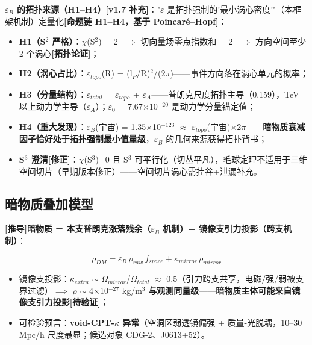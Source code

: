 \documentclass[UTF8,fontset=windows]{csoarticle}
\newcommand{\mtag}[1]{\textbf{[#1]}}
\newcommand{\up}[1]{\ensuremath{^{#1}}}
\newcommand{\down}[1]{\ensuremath{_{#1}}}
\begin{document}
\textbf{\ensuremath{\varepsilon}\down{B} 的拓扑来源（H1--H4）\mtag{v1.7 补充}}："\ensuremath{\varepsilon} 是拓扑强制的'最小涡心密度'"（本框架机制）定量化\mtag{命题链 H1--H4，基于 Poincar\'{e}--Hopf}：
\begin{itemize}
\item \textbf{H1（S\up{2} 严格）}：\ensuremath{\chi}(S\up{2}) = 2 \ensuremath{\implies} 切向量场零点指数和 = 2 \ensuremath{\implies} 方向空间至少 2 个涡心\mtag{拓扑论证}；
\item \textbf{H2（涡心占比）}：\ensuremath{\varepsilon}\down{topo}(R) = (l\down{P}/R)\up{2}/(2\ensuremath{\pi})------事件方向落在涡心单元的概率；
\item \textbf{H3（分量结构）}：\ensuremath{\varepsilon}\down{total} = \ensuremath{\varepsilon}\down{topo} + \ensuremath{\varepsilon}\down{A}------普朗克尺度拓扑主导（0.159），TeV 以上动力学主导（\ensuremath{\varepsilon}\down{A}）；\ensuremath{\varepsilon}\down{0} = 7.67\ensuremath{\times}10\up{-20} 是动力学分量锚定值；
\item \textbf{H4（重大发现）}：\ensuremath{\varepsilon}\down{B}(宇宙) = 1.35\ensuremath{\times}10\up{-123} \ensuremath{\approx} \ensuremath{\varepsilon}\down{topo}(宇宙)\ensuremath{\times}2\ensuremath{\pi}------\textbf{暗物质衰减因子恰好处于拓扑强制最小值量级}，\ensuremath{\varepsilon}\down{B} 的几何来源获得拓扑背书；
\item \textbf{S\up{3} 澄清\mtag{修正}}：\ensuremath{\chi}(S\up{3})=0 且 S\up{3} 可平行化（切丛平凡），毛球定理不适用于三维空间切片（早期版本修正）------空间切片涡心需挂谷+泄漏补充。
\end{itemize}

\subsection{暗物质叠加模型}

\mtag{推导}\textbf{暗物质 = 本支普朗克涨落残余（\ensuremath{\varepsilon}\down{B} 机制）+ 镜像支引力投影（跨支机制）}：

\[\rho_{DM} = \varepsilon_B\,\rho_{raw}\,f_{space} + \kappa_{mirror}\,\rho_{mirror}\]

\begin{itemize}
\item 镜像支投影：\ensuremath{\kappa}\down{extra} \ensuremath{\sim} \ensuremath{\Omega}\down{mirror}/\ensuremath{\Omega}\down{total} \ensuremath{\approx} 0.5（引力跨支共享，电磁/强/弱被支界过滤）\ensuremath{\implies} \ensuremath{\rho} \ensuremath{\sim} 4\ensuremath{\times}10\up{-27} kg/m\up{3} \textbf{与观测同量级}------\textbf{暗物质主体可能来自镜像支引力投影}\mtag{待验证}；
\item 可检验预言：\textbf{void-CPT-\ensuremath{\kappa} 异常}（空洞区弱透镜偏强 + 质量-光脱耦，10--30 Mpc/h 尺度最显；候选对象 CDG-2、J0613+52）。
\end{itemize}
\end{document}
